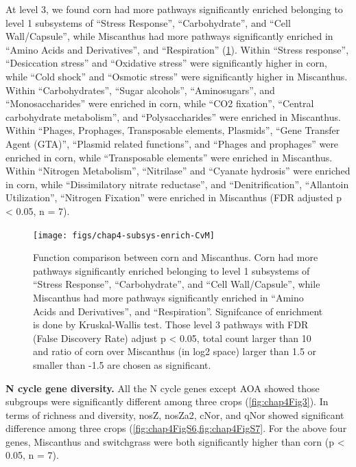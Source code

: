 \documentclass[]{msu-thesis}
\begin{document}
At level 3, we found corn had more pathways significantly enriched belonging to level 1 subsystems of ``Stress Response'', ``Carbohydrate'', and ``Cell Wall/Capsule'', while Miscanthus had more pathways significantly enriched in ``Amino Acids and Derivatives'', and ``Respiration'' (\cref{fig:chap4FigS5}). Within ``Stress response'', ``Desiccation stress'' and ``Oxidative stress'' were significantly higher in corn, while ``Cold shock'' and ``Osmotic stress'' were significantly higher in Miscanthus. Within “Carbohydrates”, “Sugar alcohols”, ``Aminosugars'', and ``Monosaccharides'' were enriched in corn, while ``CO2 fixation'', ``Central carbohydrate metabolism'', and ``Polysaccharides'' were enriched in Miscanthus. Within ``Phages, Prophages, Transposable elements, Plasmids'', ``Gene Transfer Agent (GTA)'', ``Plasmid related functions'', and ``Phages and prophages'' were enriched in corn, while ``Transposable elements'' were enriched in Miscanthus. Within ``Nitrogen Metabolism'', ``Nitrilase'' and ``Cyanate hydrosis'' were enriched in corn, while ``Dissimilatory nitrate reductase'', and ``Denitrification'', ``Allantoin Utilization'', ``Nitrogen Fixation'' were enriched in Miscanthus (FDR adjusted p < 0.05, n = 7).


\begin{figure}[tbph!]
  \centering
  \texttt{[image: figs/chap4-subsys-enrich-CvM]}
  \caption[Function comparison between corn and Miscanthus]{Function comparison between corn and Miscanthus. Corn had more pathways significantly enriched belonging to level 1 subsystems of ``Stress Response'', ``Carbohydrate'', and ``Cell Wall/Capsule'', while Miscanthus had more pathways significantly enriched in ``Amino Acids and Derivatives'', and ``Respiration''. Signifcance of enrichment is done by Kruskal-Wallis test. Those level 3 pathways with FDR (False Discovery Rate) adjust p < 0.05, total count larger than 10 and ratio of corn over Miscanthus (in log2 space) larger than 1.5  or smaller than -1.5 are chosen as significant.}
  \label{fig:chap4FigS5}
\end{figure}



\textbf{N cycle gene diversity. }
All the N cycle genes except AOA showed those subgroups were significantly different among three crops (\cref{fig:chap4Fig3}). In terms of richness and diversity, nosZ, nosZa2, cNor, and qNor showed significant difference among three crops (\cref{fig:chap4FigS6,fig:chap4FigS7}. For the above four genes, Miscanthus and switchgrass were both significantly higher than corn (p < 0.05, n = 7).
\end{document}
